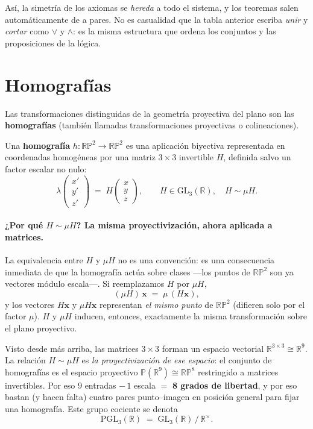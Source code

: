 \documentclass[11pt,a4paper]{article}
\newcommand{\RP}{\mathbb{RP}}
\newcommand{\R}{\mathbb{R}}
\begin{document}
Así, la simetría de los axiomas se \emph{hereda} a todo el sistema, y los
teoremas salen automáticamente de a pares. No es casualidad que la tabla
anterior escriba \emph{unir} y \emph{cortar} como $\vee$ y $\wedge$: es la
misma estructura que ordena los conjuntos y las proposiciones de la
lógica.

\section{Homografías}
\label{sec:homografias}

Las transformaciones distinguidas de la geometría proyectiva del plano son
las \textbf{homografías} (también llamadas transformaciones proyectivas o
colineaciones).

\begin{defbox}
Una \textbf{homografía} $h:\RP^2\to\RP^2$ es una aplicación biyectiva
representada en coordenadas homogéneas por una matriz $3\times 3$
invertible $H$, definida salvo un factor escalar no nulo:
\[
  \lambda
  \begin{pmatrix} x'\\ y'\\ z'\end{pmatrix}
  \;=\;
  H \begin{pmatrix} x\\ y\\ z\end{pmatrix},
  \qquad
  H\in\mathrm{GL}_3(\R),
  \quad H\sim\mu H.
\]
\end{defbox}

\paragraph{¿Por qué $H\sim\mu H$? La misma proyectivización, ahora aplicada a matrices.}
La equivalencia entre $H$ y $\mu H$ no es una convención: es una
consecuencia inmediata de que la homografía actúa sobre clases —los
puntos de $\RP^2$ son ya vectores módulo escala—. Si reemplazamos $H$
por $\mu H$,
\[
  (\mu H)\,\mathbf{x} \;=\; \mu\,(H\mathbf{x}),
\]
y los vectores $H\mathbf{x}$ y $\mu H\mathbf{x}$ representan
\emph{el mismo punto} de $\RP^2$ (difieren solo por el factor $\mu$).
$H$ y $\mu H$ inducen, entonces, exactamente la misma transformación
sobre el plano proyectivo.

Visto desde más arriba, las matrices $3\times 3$ forman un espacio
vectorial $\R^{3\times 3}\cong\R^{9}$. La relación
$H\sim\mu H$ es \emph{la proyectivización de ese espacio}: el conjunto
de homografías es el espacio proyectivo $\mathbb P(\R^{9})\cong\RP^{8}$
restringido a matrices invertibles. Por eso $9$ entradas $-\,1$ escala
$=$ \textbf{8 grados de libertad}, y por eso bastan (y hacen falta)
cuatro pares punto--imagen en posición general para fijar una
homografía. Este grupo cociente se denota
\[
  \mathrm{PGL}_3(\R) \;=\; \mathrm{GL}_3(\R)\,\big/\,\R^{\times}.
\]
\end{document}
